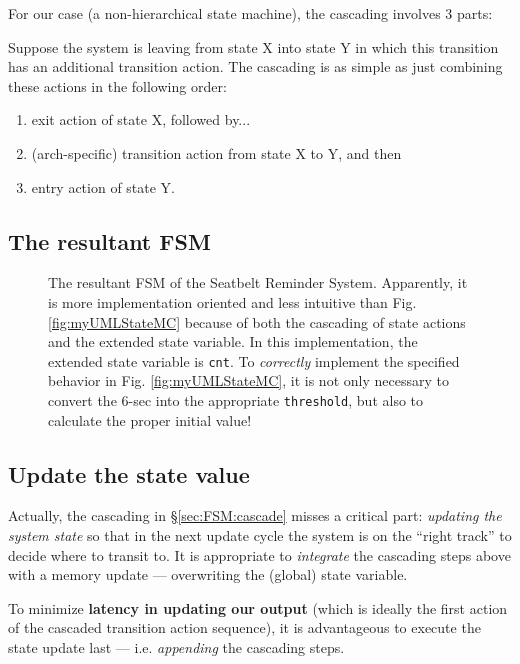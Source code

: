 \documentclass[12pt,a4paper]{scrartcl}
\begin{document}
		For our case (a non-hierarchical state machine), 
		the cascading involves 3 parts:
		
		Suppose the system is leaving from state X into state Y in which this transition has an additional transition action. 
		The cascading is as simple as just combining these actions in the following order:
		\begin{enumerate}
			\item exit action of state X, followed by...
			\item (arch-specific) transition action from state X to Y, and then
			\item entry action of state Y.
		\end{enumerate}
	
	\subsection{The resultant FSM} \label{sec:FSM:done}
	\begin{figure}[H]
		\centering
		
		\caption{The resultant FSM of the Seatbelt Reminder System. 
			Apparently, it is more implementation oriented and less intuitive than Fig. \ref{fig:myUMLStateMC} 
			because of both the cascading of state actions and the extended state variable. 
			In this implementation, the extended state variable is \texttt{cnt}. 
			To \textit{correctly} implement the specified behavior in Fig. \ref{fig:myUMLStateMC}, 
			it is not only necessary to convert the 6-sec into the appropriate \texttt{threshold}, 
			but also to calculate the proper initial value!}
		\label{fig:myFSM}
	\end{figure}

	\subsection{Update the state value} 
	Actually, the cascading in \S \ref{sec:FSM:cascade} misses a critical part:
	\textit{updating the system state} 
	so that in the next update cycle 
	the system is on the ``right track'' to decide where to transit to.
	It is appropriate to \textit{integrate} the cascading steps above with 
	a memory update --- overwriting the (global) state variable.
	
	To minimize \textbf{latency in updating our output} (which is ideally the first action of the cascaded transition action sequence), it is advantageous to execute the state update last --- i.e. \textit{appending} the cascading steps.
	
\end{document}
